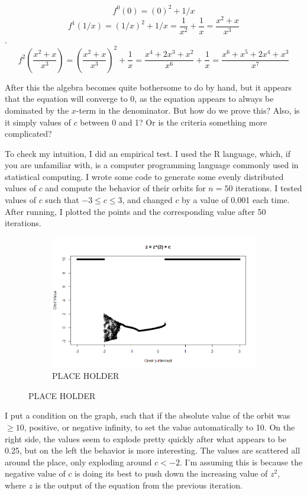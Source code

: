 \documentclass[20pt]{article} %
\begin{document}
$$ f^{0}(0) = (0)^{2} + 1/x$$
$$f^{1}(1/x) = (1/x)^{2} + 1/x = \frac{1}{x^{2}} + \frac{1}{x} = \frac{x^{2}+x}{x^{3}}$$.
$$f^{2}(\frac{x^{2}+x}{x^{3}}) = (\frac{x^{2}+x}{x^{3}})^{2} + \frac{1}{x} = \frac{x^{4}+2x^{3}+x^{2}}{x^{6}} + \frac{1}{x} = \frac{x^{6}+x^{5}+2x^{4}+x^{3}}{x^{7}}$$

After this the algebra becomes quite bothersome to do by hand, but it appears that the equation will converge to 0, as the equation appears to always be dominated by the $x$-term in the denominator.  But how do we prove this? Also, is it simply values of $c$ between 0 and 1? Or is the criteria something more complicated? 

\newpage
To check my intuition, I did an empirical test.  I used the R language, which, if you are unfamiliar with, is a computer programming language commonly used in statistical computing. I wrote some code to generate some evenly distributed values of $c$ and compute the behavior of their orbits for $n=50$ iterations. I tested values of $c$ such that $-3  \leq c \leq 3$, and changed $c$ by a value of 0.001 each time. After running, I plotted the points and the corresponding value after 50 iterations.

\begin{figure}[!htbp]
  	\centering
   	\begin{subfigure}[p]{0.95\linewidth}
    	\includegraphics[width=\linewidth]{./figures/growth.png}
	\caption{PLACE HOLDER}
   	\end{subfigure}
\end{figure}

I put a condition on the graph, such that if the absolute value of the orbit was $\geq 10$, positive, or negative infinity, to set the value automatically to 10.  On the right side, the values seem to explode pretty quickly after what appears to be 0.25, but on the left the behavior is more interesting.  The values are scattered all around the place, only exploding around $c < -2$. I'm assuming this is because the negative value of $c$ is doing its best to push down the increasing value of $z^{2}$, where $z$ is the output of the equation from the previous iteration. \\
\end{document}
